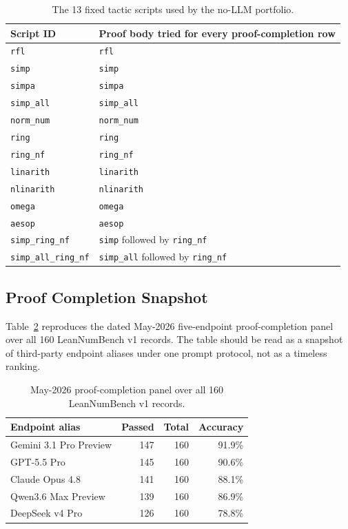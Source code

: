 \begin{table}[H]
\centering
\caption{The 13 fixed tactic scripts used by the no-LLM portfolio.}
\label{tab:supp-tactic-scripts}
\scriptsize
\begin{tabularx}{\linewidth}{lX}
\toprule
Script ID & Proof body tried for every proof-completion row\\
\midrule
\texttt{rfl} & \texttt{rfl}\\
\texttt{simp} & \texttt{simp}\\
\texttt{simpa} & \texttt{simpa}\\
\texttt{simp\_all} & \texttt{simp\_all}\\
\texttt{norm\_num} & \texttt{norm\_num}\\
\texttt{ring} & \texttt{ring}\\
\texttt{ring\_nf} & \texttt{ring\_nf}\\
\texttt{linarith} & \texttt{linarith}\\
\texttt{nlinarith} & \texttt{nlinarith}\\
\texttt{omega} & \texttt{omega}\\
\texttt{aesop} & \texttt{aesop}\\
\texttt{simp\_ring\_nf} & \texttt{simp} followed by \texttt{ring\_nf}\\
\texttt{simp\_all\_ring\_nf} & \texttt{simp\_all} followed by \texttt{ring\_nf}\\
\bottomrule
\end{tabularx}
\end{table}

\subsection{Proof Completion Snapshot}

Table~\ref{tab:supp-proof-snapshot} reproduces the dated May-2026
five-endpoint proof-completion panel over all 160 LeanNumBench v1 records. The
table should be read as a snapshot of third-party endpoint aliases under one
prompt protocol, not as a timeless ranking.

\begin{table}[htbp]
\centering
\caption{May-2026 proof-completion panel over all 160 LeanNumBench v1 records.}
\label{tab:supp-proof-snapshot}
\begin{tabular}{lrrr}
\toprule
Endpoint alias & Passed & Total & Accuracy\\
\midrule
Gemini 3.1 Pro Preview & 147 & 160 & 91.9\%\\
GPT-5.5 Pro & 145 & 160 & 90.6\%\\
Claude Opus 4.8 & 141 & 160 & 88.1\%\\
Qwen3.6 Max Preview & 139 & 160 & 86.9\%\\
DeepSeek v4 Pro & 126 & 160 & 78.8\%\\
\bottomrule
\end{tabular}
\end{table}

